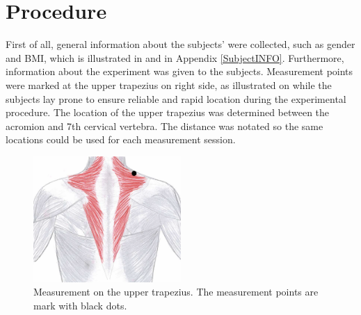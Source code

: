 


\section{Procedure}
First of all, general information about the subjects’ were collected, such as gender and BMI, which is illustrated in   and  in Appendix \ref{SubjectINFO}. Furthermore, information about the experiment was given to the subjects. Measurement points were marked at the upper trapezius on right side, as illustrated on  while the subjects lay prone to ensure reliable and rapid location during the experimental procedure. The location of the upper trapezius was determined between the acromion and 7th cervical vertebra. The distance was notated so the same locations could be used for each measurement session. 

\begin{figure}[H]
	\includegraphics[width=0.5\textwidth]{figures/trapezius} 
	\caption{Measurement on the upper trapezius. The measurement points are mark with black dots.}
	\label{fig:trapezius}  
\end{figure}  

